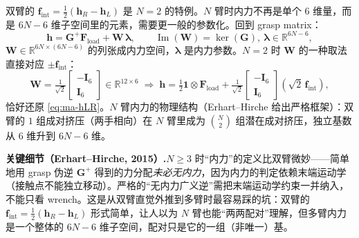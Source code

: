 双臂的 $\mathbf{f}_{\text{int}}=\tfrac12(\mathbf{h}_R-\mathbf{h}_L)$ 是 $N=2$ 的特例。$N$ 臂时内力不再是单个 $6$ 维量，而是 $6N-6$ 维子空间里的元素，需要更一般的参数化。回到 grasp matrix：
\begin{equation}
  \mathbf{h}=\mathbf{G}^{+}\mathbf{F}_{\text{load}}+\mathbf{W}\,\boldsymbol{\lambda},\qquad
  \operatorname{Im}(\mathbf{W})=\ker(\mathbf{G}),\ \boldsymbol{\lambda}\in\mathbb{R}^{6N-6},
  \label{eq:ma-narm-param}
\end{equation}
$\mathbf{W}\in\mathbb{R}^{6N\times(6N-6)}$ 的列张成内力空间，$\boldsymbol{\lambda}$ 是内力参数。$N=2$ 时 $\mathbf{W}$ 的一种取法直接对应 $\pm\mathbf{f}_{\text{int}}$：
\begin{equation}
  \mathbf{W}=\tfrac1{\sqrt2}\begin{bmatrix}-\mathbf{I}_6\\ \mathbf{I}_6\end{bmatrix}\in\mathbb{R}^{12\times6}
  \;\Rightarrow\;
  \mathbf{h}=\tfrac12\mathbf{1}\otimes\mathbf{F}_{\text{load}}+\tfrac1{\sqrt2}\begin{bmatrix}-\mathbf{I}_6\\ \mathbf{I}_6\end{bmatrix}(\sqrt2\,\mathbf{f}_{\text{int}}),
  \label{eq:ma-narm-W2}
\end{equation}
恰好还原 \cref{eq:ma-hLR}。$N$ 臂内力的物理结构（Erhart--Hirche\cite{erhart2017internal} 给出严格框架）：双臂的 $1$ 组成对挤压（两手相向）在 $N$ 臂里成为 $\binom{N}{2}$ 组潜在成对挤压，独立基数从 $6$ 维升到 $6N-6$ 维。

\begin{note}
\textbf{关键细节（Erhart--Hirche, 2015）.}\;$N\ge3$ 时“内力”的定义比双臂微妙——简单地用 grasp 伪逆 $\mathbf{G}^{+}$ 得到的力分配\emph{未必无内力}，因为内力的判定依赖末端运动学（接触点不能独立移动）。严格的“无内力广义逆”需把末端运动学约束一并纳入，不能只看 wrench。这是从双臂直觉外推到多臂时最容易踩的坑：双臂的 $\mathbf{f}_{\text{int}}=\tfrac12(\mathbf{h}_R-\mathbf{h}_L)$ 形式简单，让人以为 $N$ 臂也能“两两配对”理解，但多臂内力是一个整体的 $6N-6$ 维子空间，配对只是它的一组（非唯一）基。
\end{note}

